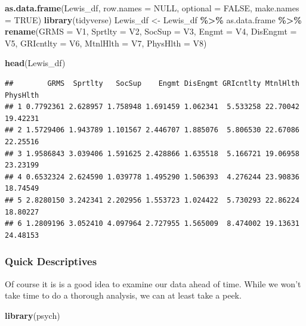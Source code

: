\documentclass[
  11pt,
]{book}
\newenvironment{Shaded}{\begin{snugshade}}{\end{snugshade}}
\newcommand{\AttributeTok}[1]{\textcolor[rgb]{0.27,0.27,0.27}{#1}}
\newcommand{\ConstantTok}[1]{\textcolor[rgb]{0.37,0.37,0.37}{#1}}
\newcommand{\FunctionTok}[1]{\textcolor[rgb]{0.27,0.27,0.27}{\textbf{#1}}}
\newcommand{\NormalTok}[1]{#1}
\newcommand{\OtherTok}[1]{\textcolor[rgb]{0.37,0.37,0.37}{#1}}
\newcommand{\SpecialCharTok}[1]{\textcolor[rgb]{0.43,0.43,0.43}{\textbf{#1}}}
\begin{document}
\begin{Shaded}
\begin{Highlighting}[]
\FunctionTok{as.data.frame}\NormalTok{(Lewis\_df, }\AttributeTok{row.names =} \ConstantTok{NULL}\NormalTok{, }\AttributeTok{optional =} \ConstantTok{FALSE}\NormalTok{, }\AttributeTok{make.names =} \ConstantTok{TRUE}\NormalTok{)}
\FunctionTok{library}\NormalTok{(tidyverse)}
\NormalTok{Lewis\_df }\OtherTok{\textless{}{-}}\NormalTok{ Lewis\_df }\SpecialCharTok{\%\textgreater{}\%}
\NormalTok{    as.data.frame }\SpecialCharTok{\%\textgreater{}\%}
    \FunctionTok{rename}\NormalTok{(}\AttributeTok{GRMS =}\NormalTok{ V1, }\AttributeTok{Sprtlty =}\NormalTok{ V2, }\AttributeTok{SocSup =}\NormalTok{ V3, }\AttributeTok{Engmt =}\NormalTok{ V4, }\AttributeTok{DisEngmt =}\NormalTok{ V5,}
        \AttributeTok{GRIcntlty =}\NormalTok{ V6, }\AttributeTok{MtnlHlth =}\NormalTok{ V7, }\AttributeTok{PhysHlth =}\NormalTok{ V8)}
\end{Highlighting}
\end{Shaded}

\begin{Shaded}
\begin{Highlighting}[]
\FunctionTok{head}\NormalTok{(Lewis\_df)}
\end{Highlighting}
\end{Shaded}

\begin{verbatim}
##        GRMS  Sprtlty   SocSup    Engmt DisEngmt GRIcntlty MtnlHlth PhysHlth
## 1 0.7792361 2.628957 1.758948 1.691459 1.062341  5.533258 22.70042 19.42231
## 2 1.5729406 1.943789 1.101567 2.446707 1.885076  5.806530 22.67086 22.25516
## 3 1.9586843 3.039406 1.591625 2.428866 1.635518  5.166721 19.06958 23.23199
## 4 0.6532324 2.624590 1.039778 1.495290 1.506393  4.276244 23.90836 18.74549
## 5 2.8280150 3.242341 2.202956 1.553723 1.024422  5.730293 22.86224 18.80227
## 6 1.2809196 3.052410 4.097964 2.727955 1.565009  8.474002 19.13631 24.48153
\end{verbatim}

\hypertarget{quick-descriptives}{%
\subsubsection{Quick Descriptives}\label{quick-descriptives}}

Of course it is is a good idea to examine our data ahead of time. While we won't take time to do a thorough analysis, we can at least take a peek.

\begin{Shaded}
\begin{Highlighting}[]
\FunctionTok{library}\NormalTok{(psych)}
\end{Highlighting}
\end{Shaded}
\end{document}

